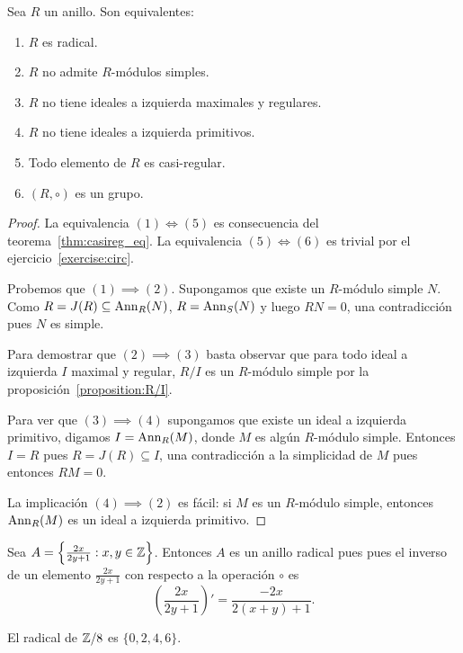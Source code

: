 \begin{theorem}
	\label{theorem:anillo_radical}
	Sea $R$ un anillo. Son equivalentes:
	\begin{enumerate}
		\item $R$ es radical.
		\item $R$ no admite $R$-módulos simples.
		\item $R$ no tiene ideales a izquierda maximales y regulares.
		\item $R$ no tiene ideales a izquierda primitivos.
		\item Todo elemento de $R$ es casi-regular.
		\item $(R,\circ)$ es un grupo.
	\end{enumerate}
\end{theorem}

\begin{proof}
	La equivalencia $(1)\Longleftrightarrow(5)$ es consecuencia del
	teorema~\ref{thm:casireg_eq}. La equivalencia $(5)\Longleftrightarrow(6)$
	es trivial por el ejercicio~\ref{exercise:circ}.

	Probemos que $(1)\implies(2)$. Supongamos que existe un $R$-módulo simple
	$N$.  Como $R=J(R)\subseteq\operatorname{Ann}_R(N)$, $R=\operatorname{Ann}_S(N)$ y luego $RN=0$, una
	contradicción pues $N$ es simple. 
	
	Para demostrar que $(2)\implies(3)$ basta observar que para todo ideal a
	izquierda $I$ maximal y regular, $R/I$ es un $R$-módulo simple por la
	proposición~\ref{proposition:R/I}. 
	
	Para ver que $(3)\implies(4)$ supongamos que existe un ideal a izquierda
	primitivo, digamos $I=\operatorname{Ann}_R(M)$, donde $M$ es algún $R$-módulo simple.
	Entonces $I=R$ pues $R=J(R)\subseteq I$, una contradicción a la simplicidad
	de $M$ pues entonces $RM=0$.

	La implicación $(4)\implies(2)$ es fácil: si $M$ es un $R$-módulo simple,
	entonces $\operatorname{Ann}_R(M)$ es un ideal a izquierda primitivo.
\end{proof}

\begin{example}
	Sea $A=\left\{\frac{2x}{2y+1}:x,y\in\mathbb{Z}\right\}$. Entonces $A$ es un anillo radical pues
	pues el inverso de un elemento $\frac{2x}{2y+1}$ con respecto a la operación $\circ$ es 
	\[
	\left(\frac{2x}{2y+1}\right)'=\frac{-2x}{2(x+y)+1}.
	\]
\end{example}

\begin{example}
	El radical de $\mathbb{Z}/8$ es $\{0,2,4,6\}$. 
\end{example}

